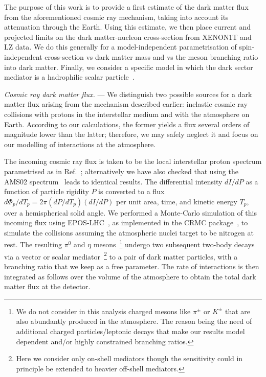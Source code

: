 \documentclass[prl,twocolumn,groupedaddress,nofootinbib, superscriptaddress]{revtex4-1}
\begin{document}
The purpose of this work is to provide a first estimate of the dark matter flux from the aforementioned cosmic ray mechanism, taking into account its attenuation through the Earth. Using this estimate, we then place current and projected limits on the dark matter-nucleon cross-section from XENON1T and LZ data. We do this generally for a model-independent parametrisation of spin-independent cross-section vs dark matter mass and vs the meson branching ratio into dark matter. Finally, we consider a specific model in which the dark sector mediator is a hadrophilic scalar particle~\cite{Batell:2018fqo}. 


{\it Cosmic ray dark matter flux.} --- We distinguish two possible sources for a dark matter flux arising from the mechanism described earlier: inelastic cosmic ray collisions with protons in the interstellar medium and with the atmosphere on Earth. According to our calculations, the former yields a flux several orders of magnitude lower than the latter; therefore, we may safely neglect it and focus on our modelling of interactions at the atmosphere. 

The incoming cosmic ray flux is taken to be the local interstellar proton spectrum parametrised as in Ref.~\cite{Boschini:2017fxq}; alternatively we have also checked that using the AMS02 spectrum~\cite{Consolandi:2014uia} leads to identical results. The differential intensity $dI/dP$ as a function of particle rigidity $P$ is converted to a flux $d\Phi_p / dT_p = 2\pi (dP/dT_p)(dI/dP)$ per unit area, time, and kinetic energy $T_p$, over a hemispherical solid angle. We performed a Monte-Carlo simulation of this incoming flux using EPOS-LHC~\cite{Pierog:2013ria}, as implemented in the CRMC package~\cite{CRMC}, to simulate the collisions assuming the atmospheric nuclei target to be nitrogen at rest. The resulting $\pi^0$ and $\eta$ mesons~\footnote{We do not consider in this analysis charged mesons like $\pi^{\pm}$ or $K^{\pm}$ that are also abundantly produced in the atmosphere. The reason being the need of additional charged particles/leptonic decays that make our results model dependent and/or highly constrained branching ratios.} undergo two subsequent two-body decays via a vector or scalar mediator~\footnote{Here we consider only on-shell mediators though the sensitivity could in principle be extended to heavier off-shell mediators.} to a pair of dark matter particles, with a branching ratio that we keep as a free parameter. The rate of interactions is then integrated as follows over the volume of the atmosphere to obtain the total dark matter flux at the detector. 
\end{document}
